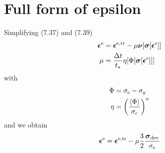 \documentclass[a4paper,11pt]{article}
\newcommand{\ts}[1]{\text{\boldmath $#1$}}
\newcommand{\dev}{{\rm dev}}
\newcommand{\rme}{{\rm e}}
\begin{document}
\section{Full form of epsilon}
Simplifying (7.37) and (7.39)
\begin{align}
 \ts\epsilon^\rme &= \ts\epsilon^{\rm e,tr} - \mu \ts\nu[\ts\sigma[\ts\epsilon^\rme]] \\
 \mu &= \frac{\Delta t}{t_\star} \eta[\Phi[\ts\sigma[\ts\epsilon^\rme]]]
\end{align}
with 
\begin{align}
 \Phi &= \sigma_\rme - \sigma_y\\
 \eta &= \left(\frac{\langle\Phi\rangle}{\sigma_c}\right)^{n}
\end{align}
and we obtain
\begin{align}
 \ts\epsilon^\rme &= \ts\epsilon^{\rm e,tr} - \mu \frac32 \frac{\ts\sigma_\dev}{\sigma_\rme}\\
\end{align}
\end{document}
